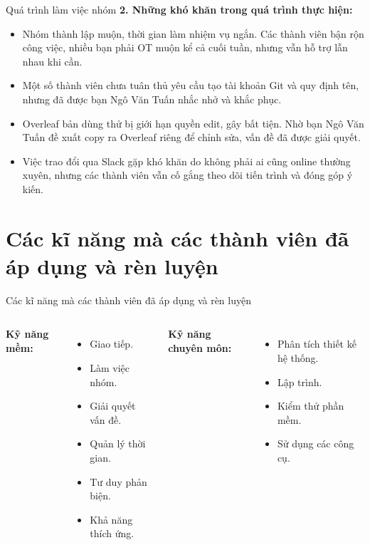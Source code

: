 \documentclass{beamer}
\begin{document}
\begin{frame}{Quá trình làm việc nhóm}
    \textbf{2. Những khó khăn trong quá trình thực hiện:}
    \begin{itemize}
        \item Nhóm thành lập muộn, thời gian làm nhiệm vụ ngắn. Các thành viên bận rộn công việc, nhiều bạn phải OT muộn kể cả cuối tuần, nhưng vẫn hỗ trợ lẫn nhau khi cần.
        \item Một số thành viên chưa tuân thủ yêu cầu tạo tài khoản Git và quy định tên, nhưng đã được bạn Ngô Văn Tuấn nhắc nhở và khắc phục.
        \item Overleaf bản dùng thử bị giới hạn quyền edit, gây bất tiện. Nhờ bạn Ngô Văn Tuấn đề xuất copy ra Overleaf riêng để chỉnh sửa, vấn đề đã được giải quyết.
        \item Việc trao đổi qua Slack gặp khó khăn do không phải ai cũng online thường xuyên, nhưng các thành viên vẫn cố gắng theo dõi tiến trình và đóng góp ý kiến.
    
    \end{itemize}
\end{frame}

\section{Các kĩ năng mà các thành viên đã áp dụng và rèn luyện}
\begin{frame}{Các kĩ năng mà các thành viên đã áp dụng và rèn luyện}
    \begin{columns}[T]
        \textbf{Kỹ năng mềm:}
        \begin{itemize}
            \item Giao tiếp.
            \item Làm việc nhóm.
            \item Giải quyết vấn đề.
            \item Quản lý thời gian.
            \item Tư duy phản biện.
            \item Khả năng thích ứng.
        \end{itemize}
        
        \textbf{Kỹ năng chuyên môn:}
        \begin{itemize}
            \item Phân tích thiết kế hệ thống.
            \item Lập trình.
            \item Kiểm thử phần mềm.
            \item Sử dụng các công cụ.
        \end{itemize}
    \end{columns}
\end{frame}
\end{document}

